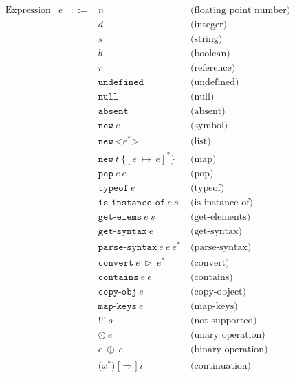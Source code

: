 \documentclass[11pt]{article}
\newcommand{\Term}[1]{\texttt{#1}}
\begin{document}
\[
\begin{array}{rrrll}
\text{Expression} & e & ::= & n & \text{(floating point number)}\\
&&|& d & \text{(integer)}\\
&&|& s & \text{(string)}\\
&&|& b & \text{(boolean)}\\
&&|& r & \text{(reference)}\\
&&|& \Term{undefined} & \text{(undefined)}\\
&&|& \Term{null} & \text{(null)}\\
&&|& \Term{absent} & \text{(absent)}\\
&&|& \Term{new}\ e & \text{(symbol)}\\ %
&&|& \Term{new}\ \Term{<} e^* \Term{>} & \text{(list)}\\ %
&&|& \Term{new}\ t\ \Term{\{} [e\ \mapsto\ e]^* \Term{\}} & \text{(map)}\\ %
&&|& \Term{pop}\ e\ e & \text{(pop)}\\
&&|& \Term{typeof}\ e & \text{(typeof)}\\
&&|& \Term{is-instance-of}\ e\ s& \text{(is-instance-of)}\\
&&|& \Term{get-elems}\ e\ s& \text{(get-elements)}\\
&&|& \Term{get-syntax}\ e& \text{(get-syntax)}\\
&&|& \Term{parse-syntax}\ e\ e\ e^*\ & \text{(parse-syntax)}\\
&&|& \Term{convert}\ e\ \triangleright\ e^*& \text{(convert)}\\
&&|& \Term{contains}\ e\ e& \text{(contains)}\\
&&|& \Term{copy-obj}\ e& \text{(copy-object)}\\
&&|& \Term{map-keys}\ e& \text{(map-keys)}\\
&&|& \Term{!!!}\ s& \text{(not supported)}\\
&&|& \odot\ e& \text{(unary operation)}\\ %
&&|& e\ \oplus\ e& \text{(binary operation)}\\ %
&&|& \Term{(} x^* \Term{)}\ \Term{[} \Rightarrow \Term{]}\ i
& \text{(continuation)}\\ %
\\

\end{array}
\]

\newpage
\end{document}
